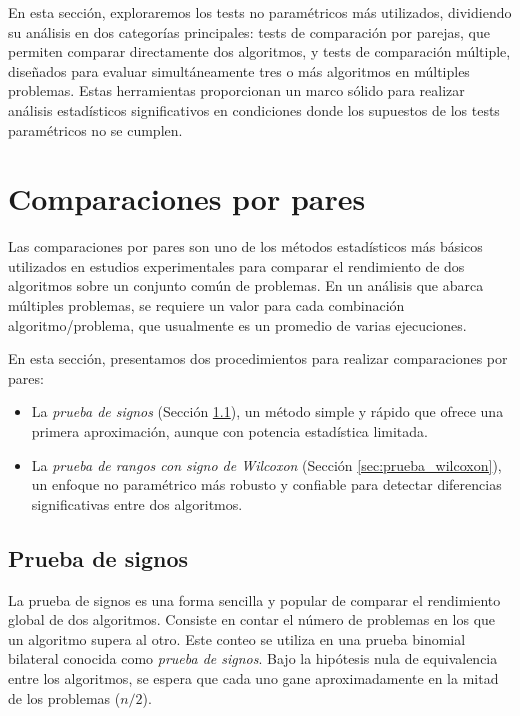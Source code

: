 En esta sección, exploraremos los tests no paramétricos más utilizados, dividiendo su análisis en dos categorías principales: tests de comparación por parejas, que permiten comparar directamente dos algoritmos, y tests de comparación múltiple, diseñados para evaluar simultáneamente tres o más algoritmos en múltiples problemas. Estas herramientas proporcionan un marco sólido para realizar análisis estadísticos significativos en condiciones donde los supuestos de los tests paramétricos no se cumplen.

\section{Comparaciones por pares}

Las comparaciones por pares son uno de los métodos estadísticos más básicos utilizados en estudios experimentales para comparar el rendimiento de dos algoritmos sobre un conjunto común de problemas. En un análisis que abarca múltiples problemas, se requiere un valor para cada combinación algoritmo/problema, que usualmente es un promedio de varias ejecuciones.

En esta sección, presentamos dos procedimientos para realizar comparaciones por pares:

\begin{itemize}
    \item La \textit{prueba de signos} (Sección \ref{sec:prueba_signos}), un método simple y rápido que ofrece una primera aproximación, aunque con potencia estadística limitada.
    \item La \textit{prueba de rangos con signo de Wilcoxon} (Sección \ref{sec:prueba_wilcoxon}), un enfoque no paramétrico más robusto y confiable para detectar diferencias significativas entre dos algoritmos.
\end{itemize}

\subsection{Prueba de signos}
\label{sec:prueba_signos}

La prueba de signos es una forma sencilla y popular de comparar el rendimiento global de dos algoritmos. Consiste en contar el número de problemas en los que un algoritmo supera al otro. Este conteo se utiliza en una prueba binomial bilateral conocida como \textit{prueba de signos}. Bajo la hipótesis nula de equivalencia entre los algoritmos, se espera que cada uno gane aproximadamente en la mitad de los problemas ($n/2$).

